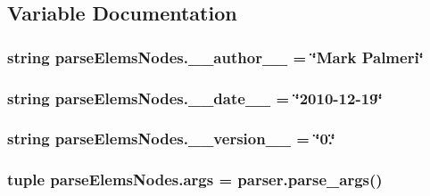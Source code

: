 \subsection{Variable Documentation}
\hypertarget{namespaceparseElemsNodes_a816a21b3796b5cf3c6dce3fd06cb43ec}{}
\subsubsection[{\+\_\+\+\_\+author\+\_\+\+\_\+}]{\setlength{\rightskip}{0pt plus 5cm}string parse\+Elems\+Nodes.\+\_\+\+\_\+author\+\_\+\+\_\+ = \char`\"{}Mark Palmeri\char`\"{}}\label{namespaceparseElemsNodes_a816a21b3796b5cf3c6dce3fd06cb43ec}
\hypertarget{namespaceparseElemsNodes_a647fd7046abaee7be08d054e074601a7}{}
\subsubsection[{\+\_\+\+\_\+date\+\_\+\+\_\+}]{\setlength{\rightskip}{0pt plus 5cm}string parse\+Elems\+Nodes.\+\_\+\+\_\+date\+\_\+\+\_\+ = \char`\"{}2010-\/12-\/19\char`\"{}}\label{namespaceparseElemsNodes_a647fd7046abaee7be08d054e074601a7}
\hypertarget{namespaceparseElemsNodes_afc893aaa0394f199b6eac48967da8bf2}{}
\subsubsection[{\+\_\+\+\_\+version\+\_\+\+\_\+}]{\setlength{\rightskip}{0pt plus 5cm}string parse\+Elems\+Nodes.\+\_\+\+\_\+version\+\_\+\+\_\+ = \char`\"{}0.\char`\"{}}\label{namespaceparseElemsNodes_afc893aaa0394f199b6eac48967da8bf2}
\hypertarget{namespaceparseElemsNodes_a3ed72f70be7277e43efb3329d63f5aad}{}
\subsubsection[{args}]{\setlength{\rightskip}{0pt plus 5cm}tuple parse\+Elems\+Nodes.\+args = parser.\+parse\+\_\+args()}\label{namespaceparseElemsNodes_a3ed72f70be7277e43efb3329d63f5aad}
\hypertarget{namespaceparseElemsNodes_aa07c055475a83647de8806433f7f265c}{}
